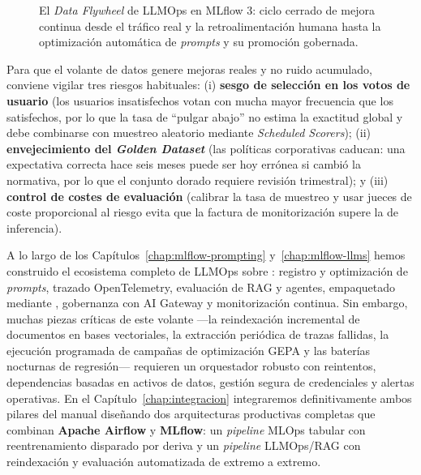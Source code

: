 \begin{figure}[htbp]
{%
}
\caption{El \textit{Data Flywheel} de LLMOps en MLflow 3: ciclo cerrado de mejora continua desde el tráfico real y la retroalimentación humana hasta la optimización automática de \textit{prompts} y su promoción gobernada.}
\label{fig:llmops-flywheel}
\end{figure}

\begin{warningbox}
Para que el volante de datos genere mejoras reales y no ruido acumulado, conviene vigilar tres riesgos habituales: (i) \textbf{sesgo de selección en los votos de usuario} (los usuarios insatisfechos votan con mucha mayor frecuencia que los satisfechos, por lo que la tasa de ``pulgar abajo'' no estima la exactitud global y debe combinarse con muestreo aleatorio mediante \textit{Scheduled Scorers}); (ii) \textbf{envejecimiento del \textit{Golden Dataset}} (las políticas corporativas caducan: una expectativa correcta hace seis meses puede ser hoy errónea si cambió la normativa, por lo que el conjunto dorado requiere revisión trimestral); y (iii) \textbf{control de costes de evaluación} (calibrar la tasa de muestreo  y usar jueces de coste proporcional al riesgo evita que la factura de monitorización supere la de inferencia).
\end{warningbox}

\begin{infobox}
A lo largo de los Capítulos~\ref{chap:mlflow-prompting} y~\ref{chap:mlflow-llms} hemos construido el ecosistema completo de LLMOps sobre : registro y optimización de \textit{prompts}, trazado OpenTelemetry, evaluación de RAG y agentes, empaquetado mediante , gobernanza con AI Gateway y monitorización continua. Sin embargo, muchas piezas críticas de este volante ---la reindexación incremental de documentos en bases vectoriales, la extracción periódica de trazas fallidas, la ejecución programada de campañas de optimización GEPA y las baterías nocturnas de regresión--- requieren un orquestador robusto con reintentos, dependencias basadas en activos de datos, gestión segura de credenciales y alertas operativas. En el Capítulo~\ref{chap:integracion} integraremos definitivamente ambos pilares del manual diseñando dos arquitecturas productivas completas que combinan \textbf{Apache Airflow} y \textbf{MLflow}: un \textit{pipeline} MLOps tabular con reentrenamiento disparado por deriva y un \textit{pipeline} LLMOps/RAG con reindexación y evaluación automatizada de extremo a extremo.
\end{infobox}
